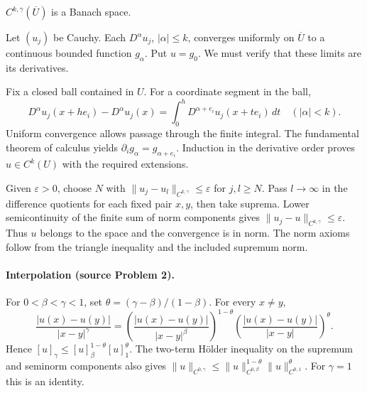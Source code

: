 \begin{theorem}
$C^{k,\gamma}(\overline U)$ is a Banach space.
\end{theorem}
\begin{expandedproof}
Let $(u_j)$ be Cauchy. Each $D^\alpha u_j$, $|\alpha|\leq k$, converges
uniformly on $\overline U$ to a continuous bounded function $g_\alpha$.
Put $u=g_0$. We must verify that these limits are its derivatives.

Fix a closed ball contained in $U$. For a coordinate segment in the ball,
\[
 D^\alpha u_j(x+he_i)-D^\alpha u_j(x)
 =\int_0^h D^{\alpha+e_i}u_j(x+te_i)\,dt
 \quad (|\alpha|<k).
\]
Uniform convergence allows passage through the finite integral.
The fundamental theorem of calculus yields
$\partial_i g_\alpha=g_{\alpha+e_i}$. Induction in the derivative order
proves $u\in C^k(U)$ with the required extensions.

Given $\varepsilon>0$, choose $N$ with
$\|u_j-u_l\|_{C^{k,\gamma}}\leq\varepsilon$ for $j,l\geq N$.
Pass $l\to\infty$ in the difference quotients for each fixed pair $x,y$,
then take suprema. Lower semicontinuity of the finite sum of norm
components gives $\|u_j-u\|_{C^{k,\gamma}}\leq\varepsilon$.
Thus $u$ belongs to the space and the convergence is in norm.
The norm axioms follow from the triangle inequality and the included
supremum norm.
\end{expandedproof}
\Needspace{45mm}
\paragraph{Interpolation (source Problem 2).}
For $0<\beta<\gamma<1$, set $\theta=(\gamma-\beta)/(1-\beta)$.
For every $x\ne y$,
\[
 \frac{|u(x)-u(y)|}{|x-y|^\gamma}
 =\left(\frac{|u(x)-u(y)|}{|x-y|^\beta}\right)^{1-\theta}
  \left(\frac{|u(x)-u(y)|}{|x-y|}\right)^\theta.
\]
Hence $[u]_\gamma\leq[u]_\beta^{1-\theta}[u]_1^\theta$.
The two-term H\"older inequality on the supremum and seminorm components
also gives
$\|u\|_{C^{0,\gamma}}\leq
\|u\|_{C^{0,\beta}}^{1-\theta}\|u\|_{C^{0,1}}^\theta$.
For $\gamma=1$ this is an identity.

